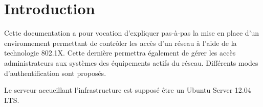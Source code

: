 \section{Introduction}

Cette documentation a pour vocation d'expliquer pas-à-pas la mise en place d'un environnement permettant de contrôler les accès d'un réseau à l'aide de la technologie 802.1X. Cette dernière permettra également de gérer les accès administrateurs aux systèmes des équipements actifs du réseau. Différents modes d'authentification sont proposés.

Le serveur accueillant l'infrastructure est supposé être un Ubuntu Server 12.04 LTS.
